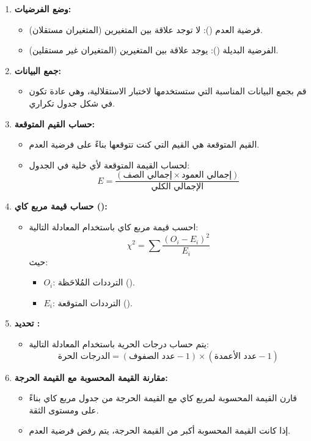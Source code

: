 \begin{enumerate}
	\item \textbf{وضع الفرضيات:}
	\begin{itemize}
		\item فرضية العدم (): لا توجد علاقة بين المتغيرين (المتغيران مستقلان).
		\item الفرضية البديلة (): يوجد علاقة بين المتغيرين (المتغيران غير مستقلين).
	\end{itemize}
	
	\item \textbf{جمع البيانات:}
	\begin{itemize}
		\item قم بجمع البيانات المناسبة التي ستستخدمها لاختبار الاستقلالية، وهي عادة تكون في شكل جدول تكراري.
	\end{itemize}
	
	\item \textbf{حساب القيم المتوقعة:}
	\begin{itemize}
		\item القيم المتوقعة هي القيم التي كنت تتوقعها بناءً على فرضية العدم.
		\item لحساب القيمة المتوقعة لأي خلية في الجدول:
		\[
		E = \frac{(\text{إجمالي الصف} \times \text{إجمالي العمود})}{\text{الإجمالي الكلي}}
		\]
	\end{itemize}
	
	\item \textbf{حساب قيمة مربع كاي ():}
	\begin{itemize}
		\item احسب قيمة مربع كاي باستخدام المعادلة التالية:
		\[
		\chi^2 = \sum \frac{(O_i - E_i)^2}{E_i}
		\]
		حيث:
		\begin{itemize}
			\item \(O_i\): الترددات المُلاحَظة ().
			\item \(E_i\): الترددات المتوقعة ().
		\end{itemize}
	\end{itemize}
	
	\item \textbf{تحديد :}
	\begin{itemize}
		\item يتم حساب درجات الحرية باستخدام المعادلة التالية:
		\[
		\text{الدرجات الحرة} = (\text{عدد الصفوف} - 1) \times (\text{عدد الأعمدة} - 1)
		\]
	\end{itemize}
	
	\item \textbf{مقارنة القيمة المحسوبة مع القيمة الحرجة:}
	\begin{itemize}
		\item قارن القيمة المحسوبة لمربع كاي مع القيمة الحرجة من جدول مربع كاي بناءً على  ومستوى الثقة.
		\item إذا كانت القيمة المحسوبة أكبر من القيمة الحرجة، يتم رفض فرضية العدم.
	\end{itemize}
	

\end{enumerate}
